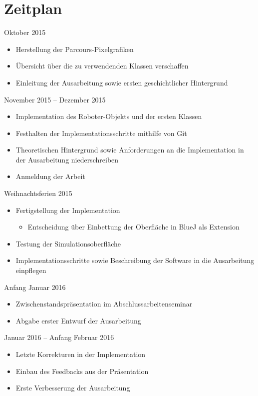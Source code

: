 \documentclass[paper=a4, pagesize, DIV=calc, BCOR=12.5mm, twoside=off, onecolumn=on, open = any, titlepage =on, parskip =half-, headsepline = on, footsepline = on, chapterprefix = on, appendixprefix = off, fontsize = 12pt, numbers = noenddot, abstract = on]{scrbook}
\numberwithin{equation}{chapter}
\begin{document}
\par \singlespacing
\section*{Zeitplan}
\onehalfspacing
Oktober 2015 
\begin{itemize}
\item Herstellung der Parcours-Pixelgrafiken
\item	Übersicht über die zu verwendenden Klassen verschaffen
\item	Einleitung der Ausarbeitung sowie ersten geschichtlicher Hintergrund
\end{itemize}

November 2015 – Dezember 2015
\begin{itemize}
\item	Implementation des Roboter-Objekts und der ersten Klassen
\item	Festhalten der Implementationsschritte mithilfe von Git
\item	Theoretischen Hintergrund sowie Anforderungen an die Implementation in der Ausarbeitung niederschreiben
\item	Anmeldung der Arbeit
\end{itemize}

Weihnachtsferien 2015 
\begin{itemize}
\item	Fertigstellung der Implementation
\begin{itemize}
\item Entscheidung über Einbettung der Oberfläche in BlueJ als Extension
\end{itemize}
\item	Testung der Simulationsoberfläche
\item	Implementationsschritte sowie Beschreibung der Software in die Ausarbeitung einpflegen
\end{itemize}

Anfang Januar 2016
\begin{itemize}
\item Zwischenstandspräsentation im Abschlussarbeitenseminar
\item Abgabe erster Entwurf der Ausarbeitung
\end{itemize}

Januar 2016 – Anfang Februar 2016
\begin{itemize}
\item Letzte Korrekturen in der Implementation
\item	Einbau des Feedbacks aus der Präsentation
\item	Erste Verbesserung der Ausarbeitung
\end{itemize}
\end{document}
